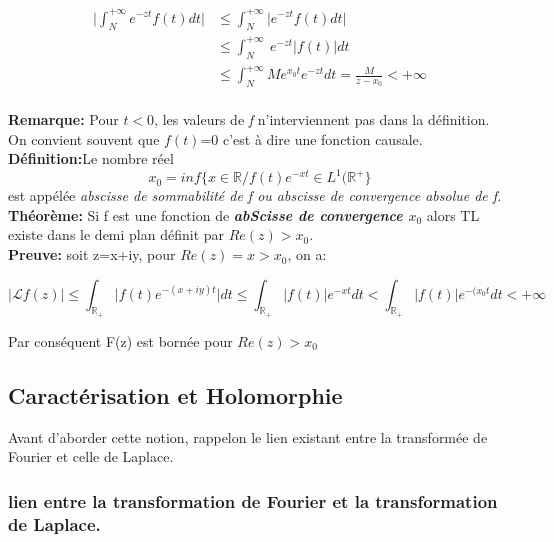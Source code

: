 \documentclass[12pt,a4paper]{report}
\begin{document}
\begin{align*}
\lvert \int_{N}^{+ \infty} e^{-zt} f(t) \mathit{dt} \rvert 
 &\leq \int_{N}^{+ \infty} \lvert e^{-zt} f(t) \mathit{dt} \rvert \\
 &\leq \int_{N}^{+ \infty} \ e^{-zt}  \lvert f(t)\vert \mathit{dt}  \\
  &\leq \int_{N}^{+ \infty} M e^{x_0 t} e^{-zt} \mathit{dt} =\frac{M}{z-x_0} < + \infty\\
\end{align*}

\textbf{Remarque:} Pour $t<0$, les valeurs de \textit{f} n'interviennent pas dans la définition. On convient souvent que \textit{$f(t)$}=0 c'est à dire une fonction causale.\\

\textbf{Définition:}Le nombre réel 
\begin{displaymath}
x_0=inf\{x\in \mathbb{R} / f(t)e^{-xt}\in L^{1}(\mathbb{R^{+}}\}
\end{displaymath}
est appélée \textit{abscisse de sommabilité de f ou abscisse de convergence absolue de f.}\\
\textbf{Théorème:}  Si f est une fonction de \textbf{\textit{abScisse de convergence   $x_0$ }} alors TL existe dans le demi plan définit par $Re(z)>x_0$.\\

\textbf{Preuve:} soit z=x+iy, pour $Re(z)=x>x_0$, on a:

\[\lvert \mathcal{L}f(z)\rvert \leq \int_{\mathbb{R}_{+}} \lvert f(t) e^{-(x+iy)t} \rvert \mathit{dt} \leq \int_{\mathbb{R}_{+}} \lvert f(t) \rvert e^{-xt}  \mathit{dt}<\int_{\mathbb{R}_{+}} \lvert f(t)\rvert e^{-(x_0t} \mathit{dt}< +\infty\] 

Par conséquent F(z)  est bornée pour $Re(z)>x_0$\\


\subsection{ Caractérisation et Holomorphie}

 Avant d'aborder cette notion, rappelon le lien existant entre la transformée de Fourier et celle de Laplace.
 
\subsubsection{ lien entre la transformation de Fourier et la transformation de Laplace.}\\
\end{document}
